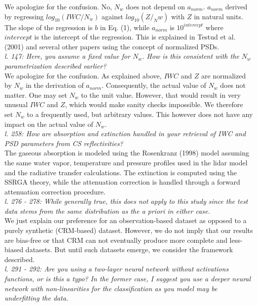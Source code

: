 \documentclass[12pt]{article}
\begin{document}
\noindent We apologize for the confusion. No, $N_w$ does not depend on $a_{norm}$. $a_{norm}$ derived by regressing $log_{10}(IWC/N_w)$ against $log_{10}(Z/_Nw)$ with $Z$ in natural units. The slope of the regression is $b$ in Eq. (1), while $a_{norm}$ is $10^{intercept}$ where $intercept$ is the intercept of the regression.  This is explained in Testud et al. (2001) and several other papers using the concept of normalized PSDs. \\

\noindent\textit{l. 147: Here, you assume a fixed value for $N_w$. How is this consistent with the $N_w$ parametrization described earlier?}\\

\noindent We apologize for the confusion. As explained above, $IWC$ and $Z$ are normalized by $N_w$ in the derivation of $a_{norm}$. Consequently, the actual value of $N_w$ does not matter. One may set $N_w$ to the unit value. However, that would result in very unusual $IWC$ and $Z$, which would make sanity checks impossible.  We therefore set $N_w$ to a frequently used, but arbitrary values. This however does not have any impact on the actual value of $N_w$.\\

\noindent\textit{l. 258: How are absorption and extinction handled in your retrieval of IWC and PSD parameters from CS reflectivities?}\\

\noindent The gaseous absorption is modeled using the Rosenkranz (1998) model assuming the same water vapor, temperature and pressure profiles used in the lidar model and the radiative transfer calculations. The extinction is computed using the SSRGA theory, while the attenuation correction is handled through a forward attenuation correction procedure.
\\
\noindent\textit{l. 276 - 278: While generally true, this does not apply to this study since the test data stems from the same distribution as the a priori in either case.}\\

\noindent We just explain our preference for an observation-based dataset as opposed to a purely synthetic (CRM-based) dataset. However, we do not imply that our results are bias-free or that CRM can not eventually produce more complete and less-biased datasets. But until such datasets emerge, we consider the framework described.\\

\noindent\textit{l. 291 - 292: Are you using a two-layer neural network without activations functions, or is this a typo? In the former case, I suggest you use a deeper neural network with non-linearities for the classification as you model may be underfitting the data.}\\
\end{document}
